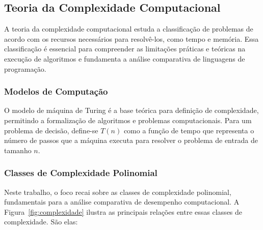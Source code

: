 \documentclass[12pt, a4paper]{article}
\begin{document}
\subsection{Teoria da Complexidade Computacional}

A teoria da complexidade computacional estuda a classificação de problemas de acordo com os recursos necessários para resolvê-los, como tempo e memória. Essa classificação é essencial para compreender as limitações práticas e teóricas na execução de algoritmos e fundamenta a análise comparativa de linguagens de programação.  

\subsubsection{Modelos de Computação}

O modelo de máquina de Turing é a base teórica para definição de complexidade, permitindo a formalização de algoritmos e problemas computacionais. Para um problema de decisão, define-se \( T(n) \) como a função de tempo que representa o número de passos que a máquina executa para resolver o problema de entrada de tamanho \( n \).

\subsubsection{Classes de Complexidade Polinomial}

Neste trabalho, o foco recai sobre as classes de complexidade polinomial, fundamentais para a análise comparativa de desempenho computacional. A Figura~\ref{fig:complexidade} ilustra as principais relações entre essas classes de complexidade. São elas:
\end{document}
